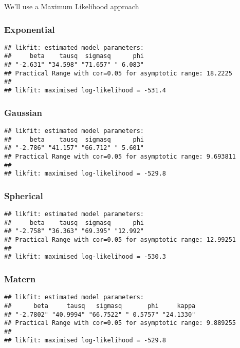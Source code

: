 \documentclass[
]{article}
\begin{document}
We'll use a Maximum Likelihood approach

\hypertarget{exponential}{%
\subsubsection{Exponential}\label{exponential}}

\begin{verbatim}
## likfit: estimated model parameters:
##     beta    tausq  sigmasq      phi 
## "-2.631" "34.598" "71.657" " 6.083" 
## Practical Range with cor=0.05 for asymptotic range: 18.2225
## 
## likfit: maximised log-likelihood = -531.4
\end{verbatim}

\hypertarget{gaussian}{%
\subsubsection{Gaussian}\label{gaussian}}

\begin{verbatim}
## likfit: estimated model parameters:
##     beta    tausq  sigmasq      phi 
## "-2.786" "41.157" "66.712" " 5.601" 
## Practical Range with cor=0.05 for asymptotic range: 9.693811
## 
## likfit: maximised log-likelihood = -529.8
\end{verbatim}

\hypertarget{spherical}{%
\subsubsection{Spherical}\label{spherical}}

\begin{verbatim}
## likfit: estimated model parameters:
##     beta    tausq  sigmasq      phi 
## "-2.758" "36.363" "69.395" "12.992" 
## Practical Range with cor=0.05 for asymptotic range: 12.99251
## 
## likfit: maximised log-likelihood = -530.3
\end{verbatim}

\hypertarget{matern}{%
\subsubsection{Matern}\label{matern}}

\begin{verbatim}
## likfit: estimated model parameters:
##      beta     tausq   sigmasq       phi     kappa 
## "-2.7802" "40.9994" "66.7522" " 0.5757" "24.1330" 
## Practical Range with cor=0.05 for asymptotic range: 9.889255
## 
## likfit: maximised log-likelihood = -529.8
\end{verbatim}
\end{document}
